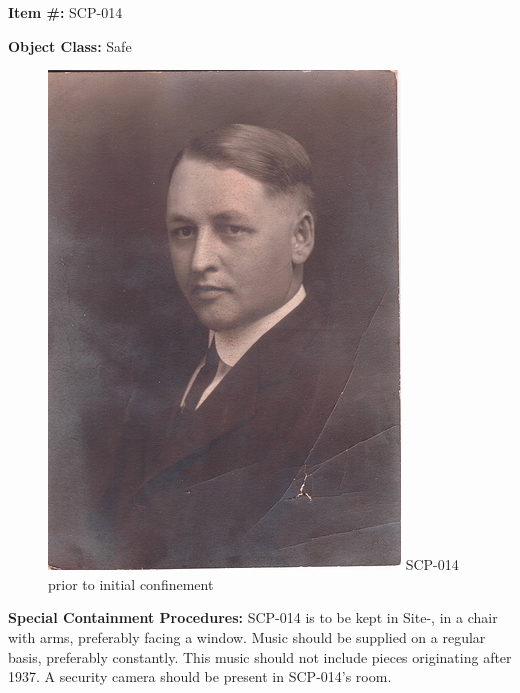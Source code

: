 
\textbf{Item \#:} SCP-014

\textbf{Object Class:} Safe

\begin{figure}[h]
\begin{center}
\includegraphics[scale=4]{scp/014.jpg}
\linebreak SCP-014 prior to initial confinement
\end{center}
\end{figure}

\textbf{Special Containment Procedures:} SCP-014 is to be kept in Site-, in a chair with arms, preferably facing a window. Music should be supplied on a regular basis, preferably constantly. This music should not include pieces originating after 1937. A security camera should be present in SCP-014's room.

